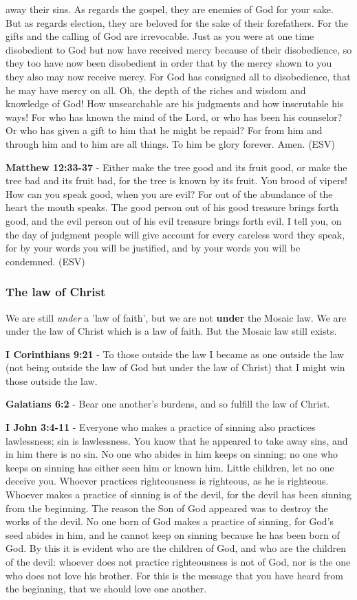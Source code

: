 \documentclass[11pt]{article}
\begin{document}
away their sins. As regards the gospel, they are enemies of God for your sake. But as regards election, they are beloved for the sake of their forefathers. For the gifts and the calling of God are irrevocable. Just as you were at one time disobedient to God but now have received mercy because of their disobedience, so they too have now been disobedient in order that by the mercy shown to you they also may now receive mercy. For God has consigned all to disobedience, that he may have mercy on all. Oh, the depth of the riches and wisdom and knowledge of God! How unsearchable are his judgments and how inscrutable his ways! For who has known the mind of the Lord, or who has been his counselor? Or who has given a gift to him that he might be repaid? For from him and through him and to him are all things. To him be glory forever. Amen. (ESV)

\textbf{Matthew 12:33-37} -  Either make the tree good and its fruit good, or make the tree bad and its fruit bad, for the tree is known by its fruit.  You brood of vipers! How can you speak good, when you are evil?  For out of the abundance of the heart the mouth speaks.  The good person out of his good treasure brings forth good, and the evil person out of his evil treasure brings forth evil.  I tell you, on the day of judgment people will give account for every careless word they speak, for by your words you will be justified, and by your words you will be condemned.  (ESV)

\subsubsection{The law of Christ}
\label{sec:org94329ba}
We are still \emph{under} a 'law of faith', but we are not \textbf{under} the Mosaic law.
We are under the law of Christ which is a law of faith.
But the Mosaic law still exists.

\textbf{I Corinthians 9:21} - To those outside the law I became as one outside the law (not being outside the law of God but under the law of Christ) that I might win those outside the law.

\textbf{Galatians 6:2} - Bear one another's burdens, and so fulfill the law of Christ.

\textbf{I John 3:4-11} - Everyone who makes a practice of sinning also practices lawlessness; sin is lawlessness.  You know that he appeared to take away sins, and in him there is no sin.  No one who abides in him keeps on sinning; no one who keeps on sinning has either seen him or known him.  Little children, let no one deceive you. Whoever practices righteousness is righteous, as he is righteous.  Whoever makes a practice of sinning is of the devil, for the devil has been sinning from the beginning. The reason the Son of God appeared was to destroy the works of the devil.  No one born of God makes a practice of sinning, for God's seed abides in him, and he cannot keep on sinning because he has been born of God.  By this it is evident who are the children of God, and who are the children of the devil: whoever does not practice righteousness is not of God, nor is the one who does not love his brother.  For this is the message that you have heard from the beginning, that we should love one another.
\end{document}

